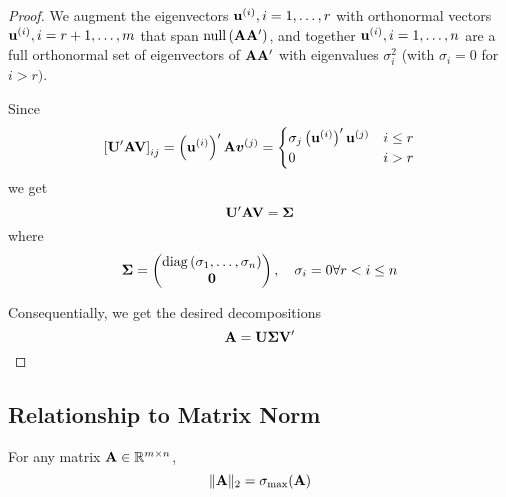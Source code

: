 \begin{proof}
	We augment the eigenvectors \(\mathbf{u}^{(i)},i=1,\ldots,r\) with orthonormal vectors \(\mathbf{u}^{(i)},i=r+1,\ldots,m\) that span \(\operatorname{null}\left(\mathbf{A}\mathbf{A}^{\prime}\right)\), and together \(\mathbf{u}^{(i)},i=1,\ldots,n\) are a full orthonormal set of eigenvectors of \(\mathbf{A}\mathbf{A}^{\prime}\) with eigenvalues \(\sigma_{i}^{2}\) (with \(\sigma_{i}=0\) for \(i>r)\).

	Since
	\begin{equation*}
		\left[\mathbf{U}^{\prime}\mathbf{A}\mathbf{V}\right]_{ij}=\left(\mathbf{u}^{(i)}\right)^{\prime}\mathbf{A}\boldsymbol{v}^{(j)}=\begin{cases}\sigma_{j}\left(\mathbf{u}^{(i)}\right)^{\prime}\mathbf{u}^{(j)} & i \leq r \\ 0 & i>r\end{cases}
	\end{equation*}
	we get
	\begin{equation*}
		\mathbf{U}^{\prime}\mathbf{A}\mathbf{V}=\boldsymbol{\Sigma}
	\end{equation*}
	where
	\begin{equation*}
		\boldsymbol{\Sigma}=\begin{pmatrix}
			\operatorname{diag}\left(\sigma_{1},\ldots,\sigma_{n}\right) \\
			\mathbf{0}
		\end{pmatrix}
		,\quad\sigma_{i}=0\forall r<i\leq n
	\end{equation*}

	Consequentially, we get the desired decompositions
	\begin{equation*}
		\mathbf{A}=\mathbf{U}\boldsymbol{\Sigma}\mathbf{V}^{\prime}
	\end{equation*}
\end{proof}

\subsection{Relationship to Matrix Norm}

\begin{theorem}
	For any matrix \(\mathbf{A}\in\mathbb{R}^{m\times n}\),
	\begin{equation}
		\|\mathbf{A}\|_{2}=\sigma_{\max}(\mathbf{A})
	\end{equation}
\end{theorem}

